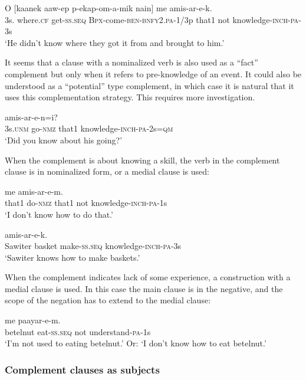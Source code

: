 \ea%
\label{ex:x1602}
\gll O  [kaanek  aaw-ep  p-ekap-om-a-mik nain]  me  amis-ar-e-k.\\
3s.   where.\textsc{cf} get-\textsc{ss}.\textsc{seq} \textsc{Bpx}-come-\textsc{ben}-\textsc{bnfy}2.\textsc{pa}-1/3p that1  not  knowledge-\textsc{inch}-\textsc{pa}-3s\\
\glt`He didn't know where they got it from and brought to him.'
\z


It seems that a clause with a nominalized verb is also used as a ``fact'' complement but only when it refers to pre-knowledge of an event. It could also be understood as a ``potential'' type complement, in which case it is natural that it uses this complementation strategy. This requires more investigation. 

\ea%
\label{ex:x1605}
  amis-ar-e-n=i? \\
3s.\textsc{unm} go-\textsc{nmz} that1 knowledge-\textsc{inch}-\textsc{pa}-2s=\textsc{qm}\\
\glt`Did you know about his going?'
\z


When the complement is about knowing a skill, the verb in the complement clause is in nominalized form, or a medial clause is used: 

\ea%
\label{ex:x1603}
  me  amis-ar-e-m.\\
that1  do-\textsc{nmz} that1 not knowledge-\textsc{inch}-\textsc{pa}-1s\\
\glt`I don't know how to do that.'
\z


\ea%
\label{ex:x1849}
  amis-ar-e-k.\\
Sawiter  basket  make-\textsc{ss}.\textsc{seq} knowledge-\textsc{inch}-\textsc{pa}-3s\\
\glt`Sawiter knows how to make baskets.'
\z


When the complement indicates lack of some experience, a construction with a medial clause is used. In this case the main clause is in the negative, and the scope of the negation has to extend to the medial clause:

\ea%
\label{ex:x1604}
\gll [Owora  en-ep]  me  paayar-e-m.\\
betelnut  eat-\textsc{ss}.\textsc{seq} not understand-\textsc{pa}-1s\\
\glt`I'm not used to eating betelnut.' Or: `I don't know how to eat betelnut.'
\z


\subsubsection[Complement clauses as subjects]{Complement clauses as subjects}

